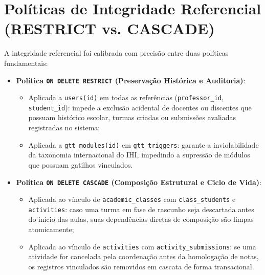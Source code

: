 \section{Políticas de Integridade Referencial (RESTRICT vs. CASCADE)}
\label{sec_politicas_integridade}

A integridade referencial foi calibrada com precisão entre duas políticas fundamentais:

\begin{itemize}
    \item \textbf{Política \texttt{ON DELETE RESTRICT} (Preservação Histórica e Auditoria)}:
    \begin{itemize}
        \item Aplicada a \texttt{users(id)} em todas as referências (\texttt{professor\_id}, \texttt{student\_id}): impede a exclusão acidental de docentes ou discentes que possuam histórico escolar, turmas criadas ou submissões avaliadas registradas no sistema;
        \item Aplicada a \texttt{gtt\_modules(id)} em \texttt{gtt\_triggers}: garante a inviolabilidade da taxonomia internacional do IHI, impedindo a supressão de módulos que possuam gatilhos vinculados.
    \end{itemize}

    \item \textbf{Política \texttt{ON DELETE CASCADE} (Composição Estrutural e Ciclo de Vida)}:
    \begin{itemize}
        \item Aplicada ao vínculo de \texttt{academic\_classes} com \texttt{class\_students} e \texttt{activities}: caso uma turma em fase de rascunho seja descartada antes do início das aulas, suas dependências diretas de composição são limpas atomicamente;
        \item Aplicada ao vínculo de \texttt{activities} com \texttt{activity\_submissions}: se uma atividade for cancelada pela coordenação antes da homologação de notas, os registros vinculados são removidos em cascata de forma transacional.
    \end{itemize}
\end{itemize}
